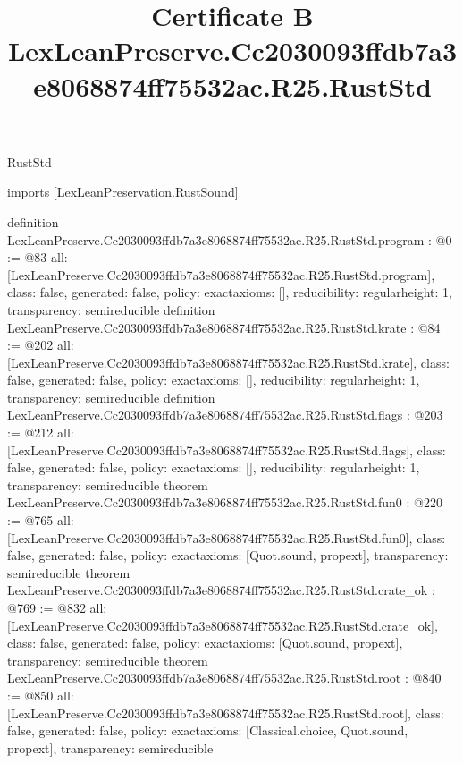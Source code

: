 \begin{lexlean}{RustStd}
\title{Certificate B LexLeanPreserve.Cc2030093ffdb7a3e8068874ff75532ac.R25.RustStd}
\begin{coremodule}
imports [LexLeanPreservation.RustSound]

definition LexLeanPreserve.Cc2030093ffdb7a3e8068874ff75532ac.R25.RustStd.program : @0 := @83 {
  all: [LexLeanPreserve.Cc2030093ffdb7a3e8068874ff75532ac.R25.RustStd.program],
  class: false,
  generated: false,
  policy: exact{axioms: []},
  reducibility: regular{height: 1},
  transparency: semireducible
}
definition LexLeanPreserve.Cc2030093ffdb7a3e8068874ff75532ac.R25.RustStd.krate : @84 := @202 {
  all: [LexLeanPreserve.Cc2030093ffdb7a3e8068874ff75532ac.R25.RustStd.krate],
  class: false,
  generated: false,
  policy: exact{axioms: []},
  reducibility: regular{height: 1},
  transparency: semireducible
}
definition LexLeanPreserve.Cc2030093ffdb7a3e8068874ff75532ac.R25.RustStd.flags : @203 := @212 {
  all: [LexLeanPreserve.Cc2030093ffdb7a3e8068874ff75532ac.R25.RustStd.flags],
  class: false,
  generated: false,
  policy: exact{axioms: []},
  reducibility: regular{height: 1},
  transparency: semireducible
}
theorem LexLeanPreserve.Cc2030093ffdb7a3e8068874ff75532ac.R25.RustStd.fun0 : @220 := @765 {
  all: [LexLeanPreserve.Cc2030093ffdb7a3e8068874ff75532ac.R25.RustStd.fun0],
  class: false,
  generated: false,
  policy: exact{axioms: [Quot.sound, propext]},
  transparency: semireducible
}
theorem LexLeanPreserve.Cc2030093ffdb7a3e8068874ff75532ac.R25.RustStd.crate_ok : @769 := @832 {
  all: [LexLeanPreserve.Cc2030093ffdb7a3e8068874ff75532ac.R25.RustStd.crate_ok],
  class: false,
  generated: false,
  policy: exact{axioms: [Quot.sound, propext]},
  transparency: semireducible
}
theorem LexLeanPreserve.Cc2030093ffdb7a3e8068874ff75532ac.R25.RustStd.root : @840 := @850 {
  all: [LexLeanPreserve.Cc2030093ffdb7a3e8068874ff75532ac.R25.RustStd.root],
  class: false,
  generated: false,
  policy: exact{axioms: [Classical.choice, Quot.sound, propext]},
  transparency: semireducible
}


\end{coremodule}
\end{lexlean}
